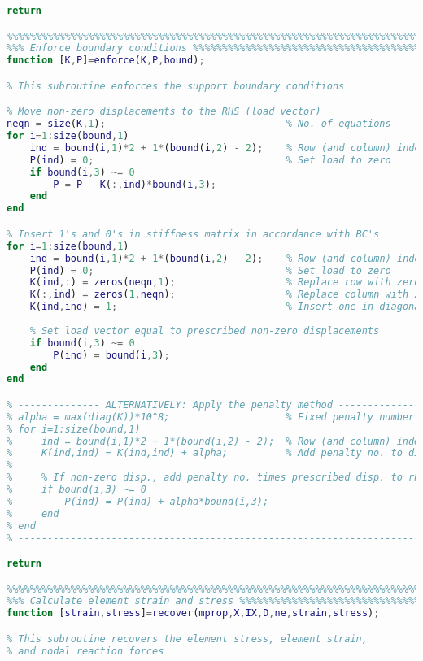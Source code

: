 \begin{lstlisting}[language=Matlab, caption = FE implementation for geometrical non-linearity, label=lst:CodeGNA]
return

%%%%%%%%%%%%%%%%%%%%%%%%%%%%%%%%%%%%%%%%%%%%%%%%%%%%%%%%%%%%%%%%%%%%%%%%%%%
%%% Enforce boundary conditions %%%%%%%%%%%%%%%%%%%%%%%%%%%%%%%%%%%%%%%%%%%
function [K,P]=enforce(K,P,bound);

% This subroutine enforces the support boundary conditions

% Move non-zero displacements to the RHS (load vector)
neqn = size(K,1);                               % No. of equations
for i=1:size(bound,1)
    ind = bound(i,1)*2 + 1*(bound(i,2) - 2);    % Row (and column) index
    P(ind) = 0;                                 % Set load to zero
    if bound(i,3) ~= 0
        P = P - K(:,ind)*bound(i,3);
    end
end

% Insert 1's and 0's in stiffness matrix in accordance with BC's
for i=1:size(bound,1)
    ind = bound(i,1)*2 + 1*(bound(i,2) - 2);    % Row (and column) index
    P(ind) = 0;                                 % Set load to zero
    K(ind,:) = zeros(neqn,1);                   % Replace row with zeros
    K(:,ind) = zeros(1,neqn);                   % Replace column with zeros
    K(ind,ind) = 1;                             % Insert one in diagonal
    
    % Set load vector equal to prescribed non-zero displacements
    if bound(i,3) ~= 0
        P(ind) = bound(i,3);
    end
end

% -------------- ALTERNATIVELY: Apply the penalty method ------------------
% alpha = max(diag(K))*10^8;                    % Fixed penalty number
% for i=1:size(bound,1)
%     ind = bound(i,1)*2 + 1*(bound(i,2) - 2);  % Row (and column) index
%     K(ind,ind) = K(ind,ind) + alpha;          % Add penalty no. to diag(K)
%    
%     % If non-zero disp., add penalty no. times prescribed disp. to rhs
%     if bound(i,3) ~= 0  
%         P(ind) = P(ind) + alpha*bound(i,3);     
%     end
% end
% -------------------------------------------------------------------------

return

%%%%%%%%%%%%%%%%%%%%%%%%%%%%%%%%%%%%%%%%%%%%%%%%%%%%%%%%%%%%%%%%%%%%%%%%%%%
%%% Calculate element strain and stress %%%%%%%%%%%%%%%%%%%%%%%%%%%%%%%%%%%
function [strain,stress]=recover(mprop,X,IX,D,ne,strain,stress);

% This subroutine recovers the element stress, element strain, 
% and nodal reaction forces
   

\end{lstlisting}
